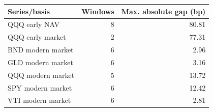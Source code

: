 \begin{tabular}{@{}lrr@{}}\toprule
Series/basis & Windows & Max. absolute gap (bp)\\\midrule
QQQ early NAV & 8 & 80.81\\
QQQ early market & 2 & 77.31\\
BND modern market & 6 & 2.96\\
GLD modern market & 6 & 3.16\\
QQQ modern market & 5 & 13.72\\
SPY modern market & 6 & 12.42\\
VTI modern market & 6 & 2.81\\
\bottomrule
\end{tabular}
